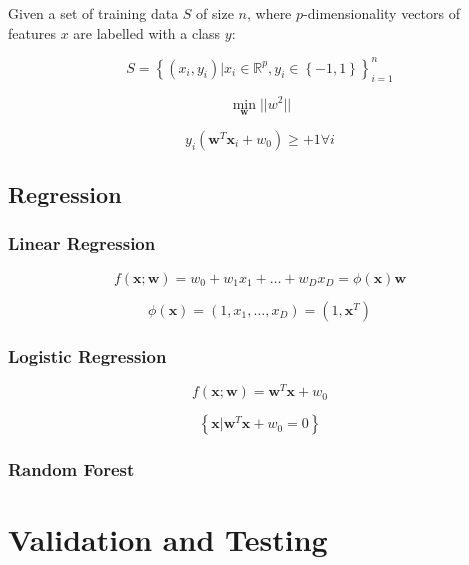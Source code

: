 Given a set of training data $S$ of size $n$, where $p$-dimensionality
vectors of features $x$ are labelled with a class $y$:

\begin{equation}
  S = \left\{ (x_i,y_i) | x_i \in \mathbb{R}^p, y_i \in \left\{ -1, 1 \right\} \right\}_{i=1}^{n}
\end{equation}

\begin{equation}
  \min_{\bm{w}} || w^2 ||
\end{equation}

\begin{equation}
  y_i(\bm{w}^T\bm{x}_i + w_0) \ge +1 \forall i
\end{equation}


\subsection{Regression}


\subsubsection{Linear Regression}

\begin{equation}
  f(\bm{x}; \bm{w}) = w_0 + w_1x_1 + \ldots + w_Dx_D = \phi(\bm{x})\bm{w}
\end{equation}

\begin{equation}
  \phi(\bm{x}) = (1, x_1, \ldots, x_D) = (1, \bm{x}^T)
\end{equation}


\subsubsection{Logistic Regression}

\begin{equation}
  f(\bm{x}; \bm{w}) = \bm{w}^{T}\bm{x} + w_0
\end{equation}

\begin{equation}
  \left\{ \bm{x} | \bm{w}^T\bm{x} + w_0 = 0 \right\}
\end{equation}


\subsubsection{Random Forest}


\section{Validation and Testing}


